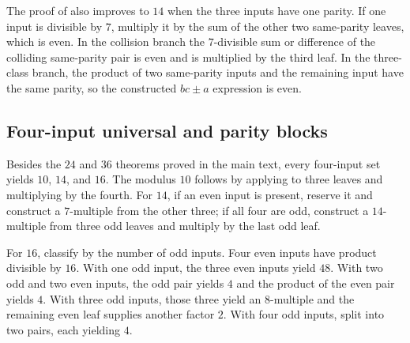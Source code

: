 The proof of  also improves to $14$ when the three inputs
have one parity.  If one input is divisible by $7$, multiply it by the sum of
the other two same-parity leaves, which is even.  In the collision branch the
$7$-divisible sum or difference of the colliding same-parity pair is even and
is multiplied by the third leaf.  In the three-class branch, the product of
two same-parity inputs and the remaining input have the same parity, so the
constructed $bc\pm a$ expression is even.

\subsection{Four-input universal and parity blocks}

Besides the $24$ and $36$ theorems proved in the main text, every four-input
set yields $10$, $14$, and $16$.  The modulus $10$ follows by applying
 to three leaves and multiplying by the fourth.  For $14$,
if an even input is present, reserve it and construct a $7$-multiple from the
other three; if all four are odd, construct a $14$-multiple from three odd
leaves and multiply by the last odd leaf.

For $16$, classify by the number of odd inputs.  Four even inputs have product
divisible by $16$.  With one odd input, the three even inputs yield $48$.
With two odd and two even inputs, the odd pair yields $4$ and the product of
the even pair yields $4$.  With three odd inputs, those three yield an
$8$-multiple and the remaining even leaf supplies another factor $2$.  With
four odd inputs, split into two pairs, each yielding $4$.

